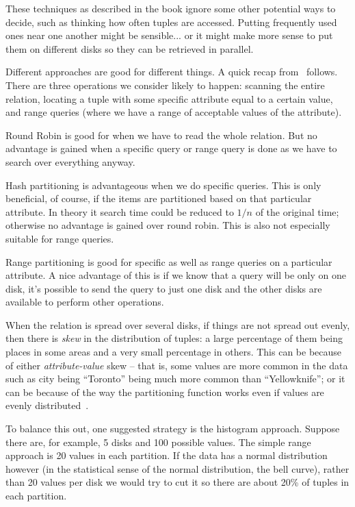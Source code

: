 These techniques as described in the book ignore some other potential ways to decide, such as thinking how often tuples are accessed. Putting frequently used ones near one another might be sensible... or it might make more sense to put them on different disks so they can be retrieved in parallel.

Different approaches are good for different things. A quick recap from~\cite{dsc} follows. There are three operations we consider likely to happen: scanning the entire relation, locating a tuple with some specific attribute equal to a certain value, and range queries (where we have a range of acceptable values of the attribute).

Round Robin is good for when we have to read the whole relation. But no advantage is gained when a specific query or range query is done as we have to search over everything anyway.

Hash partitioning is advantageous when we do specific queries. This is only beneficial, of course, if the items are partitioned based on that particular attribute. In theory it search time could be reduced to $1/n$ of the original time; otherwise no advantage is gained over round robin. This is also not especially suitable for range queries.

Range partitioning is good for specific as well as range queries on a particular attribute. A nice advantage of this is if we know that a query will be only on one disk, it's possible to send the query to just one disk and the other disks are available to perform other operations.

When the relation is spread over several disks, if things are not spread out evenly, then there is \textit{skew} in the distribution of tuples: a large percentage of them being places in some areas and a very small percentage in others. This can be because of either \textit{attribute-value} skew -- that is, some values are more common in the data such as city being ``Toronto'' being much more common than ``Yellowknife''; or it can be because of the way the partitioning function works even if values are evenly distributed~\cite{dsc}.

To balance this out, one suggested strategy is the histogram approach. Suppose there are, for example, 5 disks and 100 possible values. The simple range approach is 20 values in each partition. If the data has a normal distribution however (in the statistical sense of the normal distribution, the bell curve), rather than 20 values per disk we would try to cut it so there are about 20\% of tuples in each partition.

